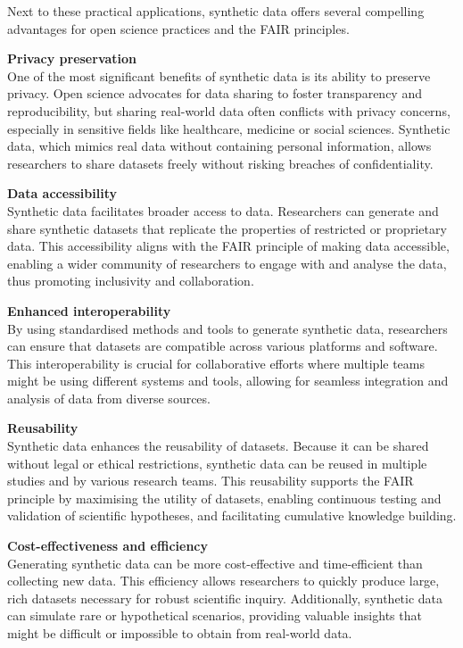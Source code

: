 Next to these practical applications, synthetic data offers several compelling advantages for open science practices and the FAIR principles. 

\textbf{Privacy preservation}\\ 
One of the most significant benefits of synthetic data is its ability to preserve privacy. Open science advocates for data sharing to foster transparency and reproducibility, but sharing real-world data often conflicts with privacy concerns, especially in sensitive fields like healthcare, medicine or social sciences. Synthetic data, which mimics real data without containing personal information, allows researchers to share datasets freely without risking breaches of confidentiality.

\textbf{Data accessibility}\\ 
Synthetic data facilitates broader access to data. Researchers can generate and share synthetic datasets that replicate the properties of restricted or proprietary data. This accessibility aligns with the FAIR principle of making data accessible, enabling a wider community of researchers to engage with and analyse the data, thus promoting inclusivity and collaboration. 

\textbf{Enhanced interoperability}\\
By using standardised methods and tools to generate synthetic data, researchers can ensure that datasets are compatible across various platforms and software. This interoperability is crucial for collaborative efforts where multiple teams might be using different systems and tools, allowing for seamless integration and analysis of data from diverse sources. 

\textbf{Reusability}\\
Synthetic data enhances the reusability of datasets. Because it can be shared without legal or ethical restrictions, synthetic data can be reused in multiple studies and by various research teams. This reusability supports the FAIR principle by maximising the utility of datasets, enabling continuous testing and validation of scientific hypotheses, and facilitating cumulative knowledge building. 

\newpage
\textbf{Cost-effectiveness and efficiency}\\
Generating synthetic data can be more cost-effective and time-efficient than collecting new data. This efficiency allows researchers to quickly produce large, rich datasets necessary for robust scientific inquiry. Additionally, synthetic data can simulate rare or hypothetical scenarios, providing valuable insights that might be difficult or impossible to obtain from real-world data. \\

